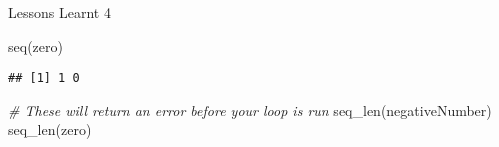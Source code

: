 \documentclass[
  ignorenonframetext,
]{beamer}
\newenvironment{Shaded}{\begin{snugshade}}{\end{snugshade}}
\newcommand{\CommentTok}[1]{\textcolor[rgb]{0.56,0.35,0.01}{\textit{#1}}}
\newcommand{\FunctionTok}[1]{\textcolor[rgb]{0.00,0.00,0.00}{#1}}
\newcommand{\NormalTok}[1]{#1}
\begin{document}
\begin{frame}[fragile]{Lessons Learnt 4}
\begin{Shaded}
\begin{Highlighting}[]
\FunctionTok{seq}\NormalTok{(zero)}
\end{Highlighting}
\end{Shaded}

\begin{verbatim}
## [1] 1 0
\end{verbatim}

\begin{Shaded}
\begin{Highlighting}[]
\CommentTok{\# These will return an error before your loop is run}
\FunctionTok{seq\_len}\NormalTok{(negativeNumber)}
\FunctionTok{seq\_len}\NormalTok{(zero)}
\end{Highlighting}
\end{Shaded}
\end{frame}
\end{document}
